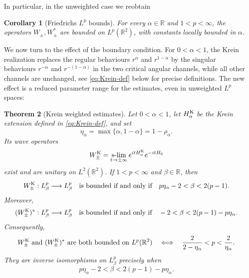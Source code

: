 \documentclass[11pt,a4paper,reqno,backref=page]{amsart}
\newcommand{\R}{\mathbb R}
\DeclareMathOperator*{\slim}{s\text{-}lim}
\numberwithin{equation}{section}
\newtheorem{theorem}{Theorem}[section]
\newtheorem{corollary}[theorem]{Corollary}
\theoremstyle{definition}
\theoremstyle{remark}
\begin{document}
In particular, in the unweighted case we reobtain

\begin{corollary}[Friedrichs $L^{p}$ bounds]
\label{cor:AB-unweighted}
  For every $\alpha\in\R$ and $1<p<\infty$, the operators
  $W_\pm,W_\pm^*$ are bounded on $L^p(\R^2)$, with constants
  locally bounded in $\alpha$. 
\end{corollary}

We now turn to the effect of the boundary condition.
For $0<\alpha<1$, the Krein realization replaces the regular
behaviours $r^\alpha$ and $r^{1-\alpha}$ by the singular
behaviours $r^{-\alpha}$ and $r^{-(1-\alpha)}$ in the two
critical angular channels, while all other channels are unchanged,
see \eqref{eq:Krein-def} below for precise definitions.
The new effect is a reduced parameter range for the estimates,
even in unweighted $L^{p}$ spaces:

\begin{theorem}[Krein weighted estimates]\label{thm:krein}
Let $0<\alpha<1$, let $H_\alpha^{\rm K}$ be the Krein extension
defined in \eqref{eq:Krein-def}, and set
\begin{equation*}
  \eta_\alpha=\max\{\alpha,1-\alpha\}=1-\rho_\alpha.
\end{equation*}
Its wave operators
$$W_\pm^{\rm K}=\slim_{t\to\pm\infty}e^{itH_\alpha^{\rm
  K}}e^{-itH_0}$$
exist and are unitary on $L^2(\R^2)$. If $1<p<\infty$ and
$\beta\in\R$, then
\begin{equation}\label{eq:Krein-W-range}
  W_\pm^{\rm K}:L^p_\beta\longrightarrow L^p_\beta
  \quad\text{is bounded if and only if}\quad
  p\eta_\alpha-2<\beta<2(p-1).
\end{equation}
Moreover,
\begin{equation}\label{eq:Krein-Wstar-range}
  (W_\pm^{\rm K})^*:L^p_\beta\longrightarrow L^p_\beta
  \quad\text{is bounded if and only if}\quad
  -2<\beta<2(p-1)-p\eta_\alpha.
\end{equation}
Consequently, 
\begin{equation}\label{eq:Krein-unweighted}
  W_\pm^{\rm K}\text{ and }(W_\pm^{\rm K})^*\text{ are both
  bounded on }L^p(\R^2)
  \quad\Longleftrightarrow\quad
  \frac{2}{2-\eta_\alpha}<p<\frac{2}{\eta_\alpha}.
\end{equation}
They are inverse isomorphisms on $L^p_\beta$
precisely when
\begin{equation}\label{eq:Krein-similarity-range}
  p\eta_\alpha-2<\beta<2(p-1)-p\eta_\alpha.
\end{equation}
\end{theorem}
\end{document}
